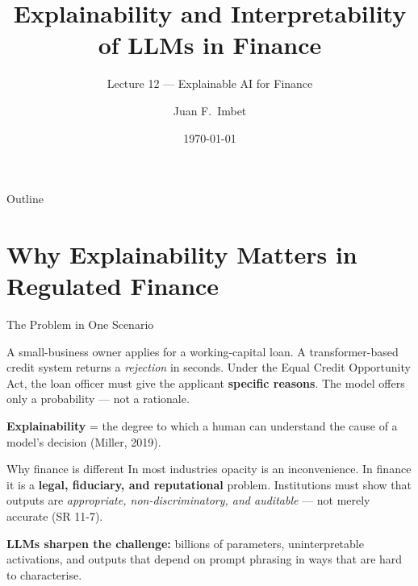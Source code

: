 \documentclass[9pt,t]{beamer}
\title{Explainability and Interpretability of LLMs in Finance}
\subtitle{Lecture 12 --- Explainable AI for Finance}
\author{Juan F.\ Imbet}
\institute{Paris Dauphine -- PSL University}
\date{\today}
\begin{document}
\begin{frame}\titlepage\end{frame}

\begin{frame}{Outline}\tableofcontents\end{frame}

\section{Why Explainability Matters in Regulated Finance}

\begin{frame}{The Problem in One Scenario}
\begin{bigpicture}
A small-business owner applies for a working-capital loan. A transformer-based
credit system returns a \emph{rejection} in seconds. Under the Equal Credit
Opportunity Act, the loan officer must give the applicant \textbf{specific
reasons}. The model offers only a probability --- not a rationale.
\end{bigpicture}

\medskip
\textbf{Explainability} = the degree to which a human can understand the cause
of a model's decision (Miller, 2019).

\medskip
\begin{block}{Why finance is different}
In most industries opacity is an inconvenience. In finance it is a
\textbf{legal, fiduciary, and reputational} problem. Institutions must show
that outputs are \emph{appropriate, non-discriminatory, and auditable} --- not
merely accurate (SR 11-7).
\end{block}

\medskip
\textbf{LLMs sharpen the challenge:} billions of parameters, uninterpretable
activations, and outputs that depend on prompt phrasing in ways that are hard
to characterise.
\end{frame}
\end{document}
